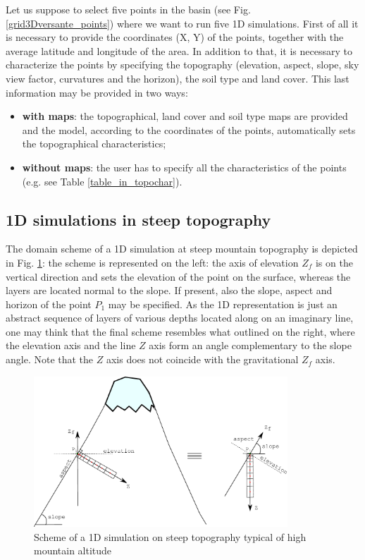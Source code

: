 Let us suppose to select five points in the basin (see Fig. \ref{grid3Dversante_points}) where we want to run five 1D simulations. First of all it is necessary to provide the coordinates (X, Y) of the points, together with the average latitude and longitude of the area. In addition to that, it is necessary to characterize the points by specifying the topography (elevation, aspect, slope, sky view factor, curvatures and the horizon), the soil type and land cover.  This last information may be provided in two ways:
\begin{itemize}
\item {\bf with maps}: the topographical, land cover and soil type maps are provided and the model, according to the coordinates of the points, automatically sets the topographical characteristics;
\item {\bf without maps}: the user has to specify all the characteristics of the points (e.g. see Table \ref{table_in_topochar}).
\end{itemize}

\subsection{1D simulations in steep topography}\label{}

The domain scheme of a 1D simulation at steep mountain topography is depicted in Fig. \ref{Fig_1Dsteep}: the scheme is represented on the left: the axis of elevation $Z_f$ is on the vertical direction and sets the elevation of the point on the surface, whereas the layers are located normal to the slope. If present, also the slope, aspect and horizon of the point $P_1$ may be specified. 
As the 1D representation is just an abstract sequence of layers of various depths located along on an imaginary line, one may think that the final scheme resembles what outlined on the right, where the elevation axis and the line $Z$ axis form an angle complementary to the slope angle. Note that the $Z$ axis does not coincide with the gravitational $Z_f$ axis.
\begin{figure}[t]
\centering
\includegraphics[width=0.85\textwidth]{./images/pic_flowchart/1Dsimul.pdf}
\caption{Scheme of a 1D simulation on steep topography typical of high mountain altitude}
\label{Fig_1Dsteep}
\end{figure}

